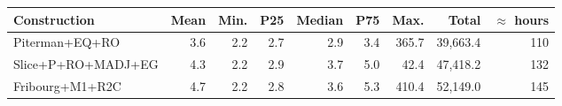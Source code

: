 \begin{tabular}{lrrrrrrrr}
  \hline
Construction & Mean & Min. & P25 & Median & P75 & Max. & Total & $\approx$ hours \\ 
  \hline
Piterman+EQ+RO & 3.6 & 2.2 & 2.7 & 2.9 & 3.4 & 365.7 & 39,663.4 & 110 \\ 
  Slice+P+RO+MADJ+EG & 4.3 & 2.2 & 2.9 & 3.7 & 5.0 & 42.4 & 47,418.2 & 132 \\ 
  Fribourg+M1+R2C & 4.7 & 2.2 & 2.8 & 3.6 & 5.3 & 410.4 & 52,149.0 & 145 \\ 
   \hline
\end{tabular}
